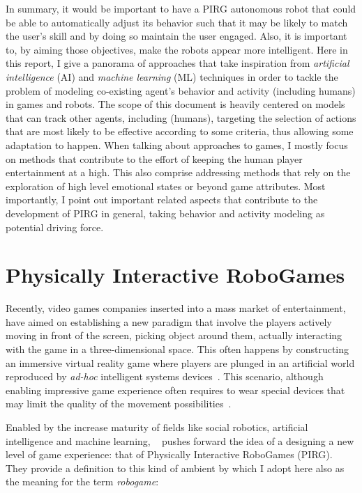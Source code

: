 In summary, it would be important to have a PIRG autonomous robot that could be able to automatically adjust its behavior such that it may be likely to match the user's skill and by doing so maintain the user engaged. Also, it is important to, by aiming those objectives, make the robots appear more intelligent. Here in this report, I give a panorama of approaches that take inspiration from \textit{artificial intelligence} (AI) and \textit{machine learning} (ML) techniques in order to tackle the problem of modeling co-existing agent's behavior and activity (including humans) in games and robots. The scope of this document is heavily centered on models that can track other agents, including (humans), targeting the selection of actions that are most likely to be effective according to some criteria, thus allowing some adaptation to happen. When talking about approaches to games, I mostly focus on methods that contribute to the effort of keeping the human player entertainment at a high. This also comprise addressing methods that rely on the exploration of high level emotional states or beyond game attributes. Most importantly, I point out important related aspects that contribute to the development of PIRG in general, taking behavior and activity modeling as potential driving force.


\section{Physically Interactive RoboGames}

Recently, video games companies inserted into a mass market of entertainment, have aimed on establishing a new paradigm that involve the players actively moving in front of the screen, picking object around them, actually interacting with the game in a three-dimensional space. This often happens by constructing an immersive virtual reality game where players are plunged in an artificial world reproduced by \textit{ad-hoc} intelligent systems devices~\cite{zyda2005}. This scenario, although enabling impressive game experience often requires to wear special devices that may limit the quality of the movement possibilities~\cite{martinoia2013physically}.

Enabled by the increase maturity of fields like social robotics, artificial intelligence and machine learning, ~\cite{martinoia2013physically} pushes forward the idea of a designing a new level of game experience: that of Physically Interactive RoboGames (PIRG). They provide a definition to this kind of ambient by which I adopt here also as the meaning for the term \textit{robogame}:

